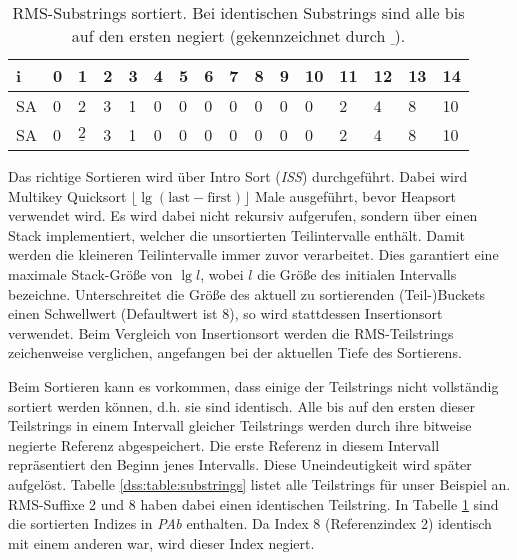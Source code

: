 \begin{table}
	\begin{tabular}{l|lllllllllllllll}
		i  & 0 & 1                                       & 2 & 3 & 4 & 5 & 6 & 7 & 8 & 9 & 10 & 11 & 12 & 13 & 14 \\ \hline
		SA & 0 & \cellcolor[HTML]{32CB00}2               & 3 & 1 & 0 & 0 & 0 & 0 & 0 & 0 & 0  & 2  & 4  & 8  & 10 \\ \hline
		SA & 0 & \cellcolor[HTML]{32CB00}$\underline{2}$ & 3 & 1 & 0 & 0 & 0 & 0 & 0 & 0 & 0  & 2  & 4  & 8  & 10 \\ \hline
	\end{tabular}
	\caption{RMS-Substrings sortiert. Bei identischen Substrings sind alle bis auf den ersten negiert (gekennzeichnet durch $\underline{\ }$).}
	\label{dss:table:substring-sorted}
\end{table}


Das richtige Sortieren wird über Intro Sort (\textit{ISS}) durchgeführt. Dabei wird Multikey Quicksort $\lfloor \lg (\text{last} - \text{first}) \rfloor$ Male ausgeführt, bevor Heapsort verwendet wird. Es wird dabei nicht rekursiv aufgerufen, sondern über einen Stack implementiert, welcher die unsortierten Teilintervalle enthält. Damit werden die kleineren Teilintervalle immer zuvor verarbeitet. Dies garantiert eine maximale Stack-Größe von $\lg l$, wobei $l$ die Größe des initialen Intervalls bezeichne. Unterschreitet die Größe des aktuell zu sortierenden (Teil-)Buckets einen Schwellwert (Defaultwert ist 8), so wird stattdessen Insertionsort verwendet. Beim Vergleich von Insertionsort werden die RMS-Teilstrings zeichenweise verglichen, angefangen bei der aktuellen Tiefe des Sortierens.

Beim Sortieren kann es vorkommen, dass einige der Teilstrings nicht vollständig sortiert werden können, d.h. sie sind identisch. Alle bis auf den ersten dieser Teilstrings in einem Intervall gleicher Teilstrings werden durch ihre bitweise negierte Referenz abgespeichert. Die erste Referenz in diesem Intervall repräsentiert den Beginn jenes Intervalls. Diese Uneindeutigkeit wird später aufgelöst. Tabelle \ref{dss:table:substrings} listet alle Teilstrings für unser Beispiel an. RMS-Suffixe 2 und 8 haben dabei einen identischen Teilstring. In Tabelle \ref{dss:table:substring-sorted} sind die sortierten Indizes in \textit{PAb} enthalten. Da Index 8 (Referenzindex 2) identisch mit einem anderen war, wird dieser Index negiert.



